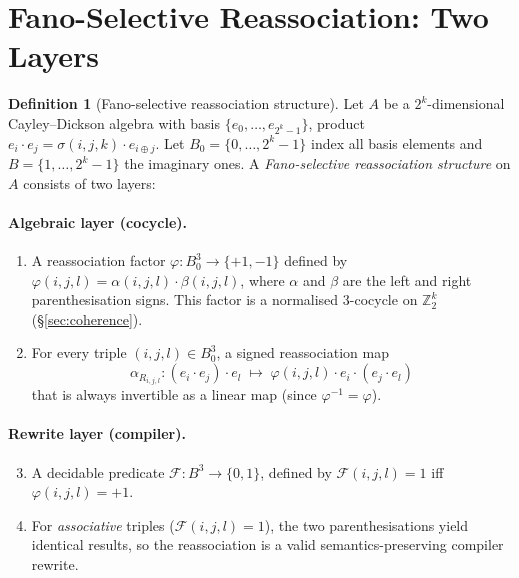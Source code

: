 \documentclass[11pt,a4paper]{article}
\theoremstyle{definition}
\newtheorem{definition}[theorem]{Definition}
\theoremstyle{remark}
\newcommand{\ZZ}{\mathbb{Z}}
\newcommand{\Fano}{\mathcal{F}}
\newcommand{\assocR}{\alpha_R}
\begin{document}
\section{Fano-Selective Reassociation: Two Layers}\label{sec:fsi}

\begin{definition}[Fano-selective reassociation structure]\label{def:fsi}
Let $A$ be a $2^k$-dimensional Cayley--Dickson algebra with basis
$\{e_0, \ldots, e_{2^k-1}\}$, product
$e_i \cdot e_j = \sigma(i,j,k) \cdot e_{i \oplus j}$. Let
$B_0 = \{0, \ldots, 2^k - 1\}$ index all basis elements and
$B = \{1, \ldots, 2^k - 1\}$ the imaginary ones.
A \emph{Fano-selective reassociation structure} on $A$ consists of
two layers:

\paragraph{Algebraic layer (cocycle).}
\begin{enumerate}
\item A reassociation factor
  $\varphi: B_0^3 \to \{+1,-1\}$ defined by
  $\varphi(i,j,l) = \alpha(i,j,l) \cdot \beta(i,j,l)$, where
  $\alpha$ and $\beta$ are the left and right parenthesisation signs.
  This factor is a normalised 3-cocycle on $\ZZ_2^k$
  (\S\ref{sec:coherence}).

\item For every triple $(i,j,l) \in B_0^3$, a signed reassociation
  map
  \[
    \assocR_{i,j,l}: (e_i \cdot e_j) \cdot e_l \;\longmapsto\;
    \varphi(i,j,l) \cdot e_i \cdot (e_j \cdot e_l)
  \]
  that is always invertible as a linear map (since $\varphi^{-1} = \varphi$).
\end{enumerate}

\paragraph{Rewrite layer (compiler).}
\begin{enumerate}\setcounter{enumi}{2}
\item A decidable predicate $\Fano: B^3 \to \{0,1\}$, defined by
  $\Fano(i,j,l) = 1$ iff $\varphi(i,j,l) = +1$.

\item For \emph{associative} triples ($\Fano(i,j,l) = 1$), the two
  parenthesisations yield identical results, so the reassociation is a
  valid semantics-preserving compiler rewrite.


\end{enumerate}
\end{definition}
\end{document}
